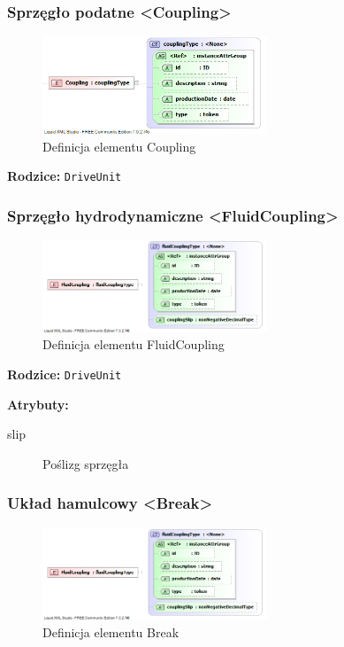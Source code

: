 \documentclass[12pt,a4paper]{article}
\begin{document}
\subsubsection{Sprzęgło podatne <Coupling>}

\begin{figure}[H]
  \centering
  \includegraphics[width=0.6\textwidth]{png/liquid/Coupling}
  \caption{Definicja elementu Coupling}
  \label{fig:coupling-xsd}
\end{figure}

\noindent\textbf{Rodzice:} \texttt{DriveUnit}

\subsubsection{Sprzęgło hydrodynamiczne <FluidCoupling>}

\begin{figure}[H]
  \centering
  \includegraphics[width=0.6\textwidth]{png/liquid/FluidCoupling}
  \caption{Definicja elementu FluidCoupling}
  \label{fig:fluidCoupling-xsd}
\end{figure}

\noindent\textbf{Rodzice:} \texttt{DriveUnit}

\noindent\textbf{Atrybuty:}
\begin{description}
\item[slip] Poślizg sprzęgła
\end{description}


\subsubsection{Układ hamulcowy <Break>}

\begin{figure}[H]
  \centering
  \includegraphics[width=0.6\textwidth]{png/liquid/FluidCoupling}
  \caption{Definicja elementu Break}
  \label{fig:break-xsd}
\end{figure}
\end{document}
